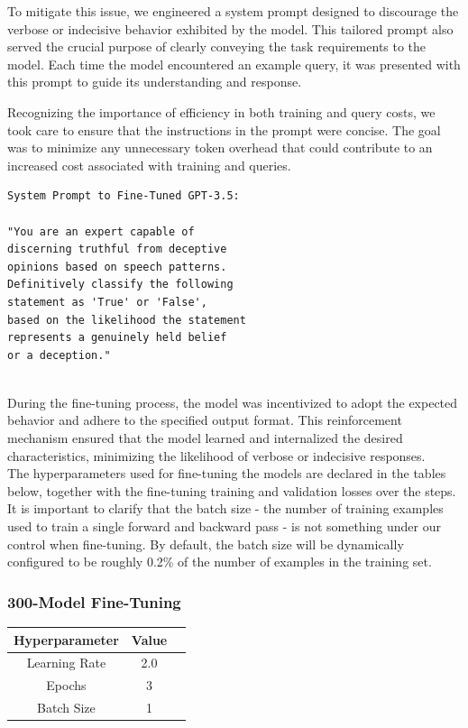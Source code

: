 \documentclass[10pt,twocolumn,letterpaper]{article}
\begin{document}
To mitigate this issue, we engineered a system prompt designed to 
discourage the verbose or indecisive behavior exhibited by the model. This tailored prompt also served
the crucial purpose of clearly conveying the task requirements to the model. Each time the model encountered 
an example query, it was presented with this prompt to guide its understanding and response.

Recognizing the importance of efficiency in both training and query costs, we took care to ensure that 
the instructions in the prompt were concise. The goal was to minimize any unnecessary token overhead that 
could contribute to an increased cost associated with training and queries.  \\

\begin{verbatim}
System Prompt to Fine-Tuned GPT-3.5:

"You are an expert capable of
discerning truthful from deceptive
opinions based on speech patterns. 
Definitively classify the following 
statement as 'True' or 'False', 
based on the likelihood the statement
represents a genuinely held belief 
or a deception."
\end{verbatim} \\

During the fine-tuning process, the model was incentivized to adopt the expected behavior and adhere to the specified output format. 
This reinforcement mechanism ensured that the model learned and internalized the desired characteristics, 
minimizing the likelihood of verbose or indecisive responses. \\

The hyperparameters used for fine-tuning the models are declared in 
the tables below, together with the fine-tuning training and validation losses over the steps.
It is important to clarify that the batch size - the number of training examples used to train a single forward and backward pass - is not something under our control when fine-tuning.
By default, the batch size will be dynamically configured to be roughly 0.2\% of the number of examples in the training set.


\subsubsection*{300-Model Fine-Tuning}


\begin{center}

    \begin{tabular}{ccc}
        \toprule
        Hyperparameter & Value \\
        \midrule
        Learning Rate & 2.0 \\
        Epochs & 3 \\
        Batch Size & 1 \\
        \bottomrule
    \end{tabular}
\end{center} 
\end{document}

